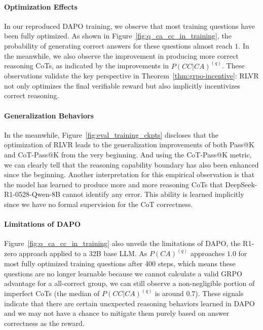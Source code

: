 \paragraph{Optimization Effects}
In our reproduced DAPO training, we observe that most training questions have been fully optimized.
As shown in Figure~\ref{fig:q_ca_cc_in_training}, the probability of generating correct answers for these questions almost reach $1$.
In the meanwhile, we also observe the improvement in producing more correct reasoning CoTs, as indicated by the improvements in $P(CC|CA)^{(q)}$.
These observations validate the key perspective in Theorem~\ref{thm:grpo-incentive}: RLVR not only optimizes the final verifiable reward but also implicitly incentivizes correct reasoning.

\paragraph{Generalization Behaviors}
In the meanwhile, Figure~\ref{fig:eval_training_ckpts} discloses that the optimization of RLVR leads to the generalization improvements of both Pass@K and CoT-Pass@K from the very beginning.
And using the CoT-Pass@K metric, we can clearly tell that the reasoning capability boundary has also been enhanced since the beginning.
Another interpretation for this empirical observation is that the model has learned to produce more and more reasoning CoTs that DeepSeek-R1-0528-Qwen-8B cannot identify any error.
This ability is learned implicitly since we have no formal supervision for the CoT correctness.

\paragraph{Limitations of DAPO}
Figure~\ref{fig:q_ca_cc_in_training} also unveils the limitations of DAPO, the R1-zero approach applied to a 32B base LLM.
As $P(CA)^{(q)}$ approaches $1.0$ for most fully optimized training questions after 400 steps, which means these questions are no longer learnable because we cannot calculate a valid GRPO advantage for a all-correct group, we can still observe a non-negligible portion of imperfect CoTs (the median of $P(CC|CA)^{(q)}$ is around $0.7$).
These signals indicate that there are certain unexpected reasoning behaviors learned in DAPO and we may not have a chance to mitigate them purely based on answer correctness as the reward.